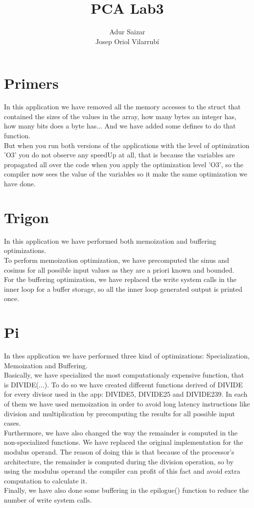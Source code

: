 \documentclass[10pt,a4paper]{article}
\author{Adur Saizar\\ Josep Oriol Vilarrubí}
\title{PCA Lab3}
\begin{document}
\maketitle
\tableofcontents
\pagebreak
\section{Primers}
In this application we have removed all the memory accesses to the struct that contained the sizes of the values in the array, how many bytes an integer has, how many bits does a byte has... And we have added some defines to do that function.\\

But when you run both versions of the applications with the level of optimization 'O3' you do not observe any speedUp at all, that is because the variables are propagated all over the code when you apply the optimization level 'O3', so the compiler now sees the value of the variables so it make the same optimization we have done.

\section{Trigon}
In this application we have performed both memoization and buffering optimizations.\\

To perform memoization optimization, we have precomputed the sinus and cosinus for all possible input values as they are a priori known and bounded.\\

For the buffering optimization, we have replaced the write system calls in the inner loop for a buffer storage, so all the inner loop generated output is printed once.

\section{Pi}
In thes application we have performed three kind of optimizations: Specialization, Memoization and Buffering.\\

Basically, we have specialized the most computationaly expensive function, that is DIVIDE(...). To do so we have created different functions derived of DIVIDE for every divisor used in the app: DIVIDE5, DIVIDE25 and DIVIDE239. In each of them we have used memoization in order to avoid long latency instructions like division and multiplication by precomputing the results for all possible input cases.\\

Furthermore, we have also changed the way the remainder is computed in the non-specialized functions. We have replaced the original implementation for the modulus operand. The reason of doing this is that because of the processor's architecture, the remainder is computed during the division operation, so by using the modulus operand the compiler can profit of this fact and avoid extra computation to calculate it.\\

Finally, we have also done some buffering in the epilogue() function to reduce the number of write system calls.
\end{document}
